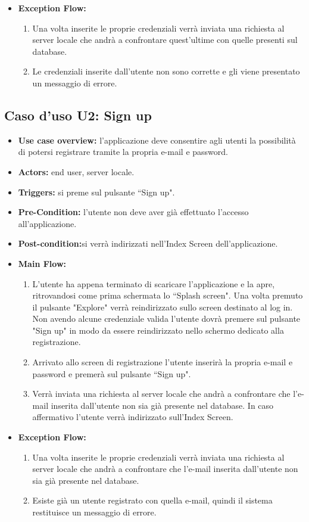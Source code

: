 \begin{itemize}
    \item \textbf{Exception Flow:}\begin{enumerate}
              \item Una volta inserite le proprie credenziali verr\`a inviata una richiesta al server locale che andr\`a a confrontare quest'ultime con quelle presenti sul database.
              \item Le credenziali inserite dall'utente non sono corrette e gli viene presentato un messaggio di errore. \end{enumerate}
\end{itemize}
\subsection*{Caso d'uso U2: Sign up}
\begin{itemize}
    \item  \textbf{Use case overview:} l'applicazione deve consentire agli utenti la possibilit\`a di potersi registrare tramite la propria e-mail e password.
    \item \textbf{Actors:} end user, server locale.
    \item \textbf{Triggers:} si preme sul pulsante ``Sign up".
    \item \textbf{Pre-Condition:} l'utente non deve aver gi\`a effettuato l'accesso all'applicazione.
    \item \textbf{Post-condition:}si verr\`a indirizzati nell'Index Screen dell'applicazione.
    \item \textbf{Main Flow:} \begin{enumerate}
              \item L'utente ha appena terminato di scaricare l'applicazione e la apre, ritrovandosi come prima schermata lo ``Splash screen". Una volta premuto il pulsante "Explore" verr\`a reindirizzato sullo screen destinato al log in. Non avendo alcune credenziale valida l'utente dovr\`a premere sul pulsante "Sign up" in modo da essere reindirizzato nello schermo dedicato alla registrazione.
              \item Arrivato allo screen di registrazione l'utente inserir\`a la propria e-mail e password e premer\`a sul pulsante ``Sign up".
              \item Verr\`a inviata una richiesta al server locale che andr\`a a confrontare che l'e-mail inserita dall'utente non sia gi\`a presente nel database. In caso affermativo l'utente verr\`a indirizzato sull'Index Screen.

          \end{enumerate}

    \item \textbf{Exception Flow:}\begin{enumerate}
              \item Una volta inserite le proprie credenziali verr\`a inviata una richiesta al server locale che andr\`a a confrontare che l'e-mail inserita dall'utente non sia gi\`a presente nel database.
              \item Esiste gi\`a un utente registrato con quella e-mail, quindi il sistema restituisce un messaggio di errore. \end{enumerate}
\end{itemize}
